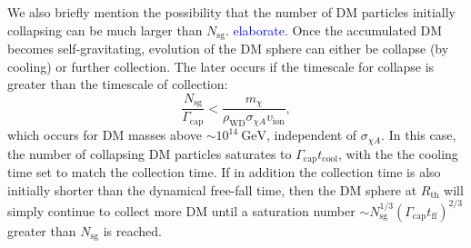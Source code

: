 \documentclass[preprintnumbers,amsmath,amssymb,prd,superscriptaddress]{revtex4}
\newcommand{\GeV}{\text{GeV}}
\begin{document}
We also briefly mention the possibility that the number of DM particles initially collapsing can be much larger than $N_\text{sg}$. 
\textcolor{blue}{elaborate}. 
Once the accumulated DM becomes self-gravitating, evolution of the DM sphere can either be collapse (by cooling) or further collection.
The later occurs if the timescale for collapse is greater than the timescale of collection:
\begin{equation}
\frac{N_\text{sg}}{\Gamma_\text{cap}} < \frac{m_\chi}{\rho_\text{WD} \sigma_{\chi A} v_\text{ion}},
\end{equation}
which occurs for DM masses above $\sim 10^{14} ~\GeV$, independent of $\sigma_{\chi A}$. 
In this case, the number of collapsing DM particles saturates to $\Gamma_\text{cap} t_\text{cool}$, with the the cooling time set to match the collection time.  
If in addition the collection time is also initially shorter than the dynamical free-fall time, then the DM sphere at $R_\text{th}$ will simply continue to collect more DM until a saturation number $\sim N_\text{sg}^{1/3} (\Gamma_\text{cap} t_\text{ff})^{2/3}$ greater than $N_\text{sg}$ is reached. 
\end{document}
